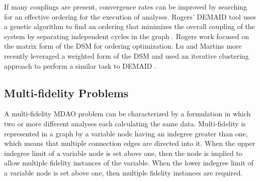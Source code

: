   If many couplings are present, convergence rates can be improved by 
  searching for an effective ordering for the execution of analyses.
  Rogers' DEMAID tool uses a genetic algorithm to find an ordering that minimizes 
  the overall coupling of the system by separating independent cycles in the 
  graph \cite{rogers1996,rogers1996demaid}. Rogers work focused on the matrix 
  form of the DSM for ordering optimization. Lu and Martins more recently leveraged 
  a weighted form of the DSM and used an iterative clustering approach to perform a 
  similar task to DEMAID \cite{Lu2012}.

\subsection{Multi-fidelity Problems}
  \label{ss:multi-fideliy problems}
  A multi-fidelity MDAO problem can be characterized by a formulation in which 
  two or more different analyses each calculating the same data. Multi-fidelity 
  is represented in a graph by a variable node having an indegree greater than 
  one, which means that multiple connection edges are directed into it. When the 
  upper indegree limit of a variable node is set above one, then the node is 
  implied to allow multiple fidelity instances of the variable. When the lower 
  indegree limit of a variable node is set above one, then multiple fidelity instances are required.

